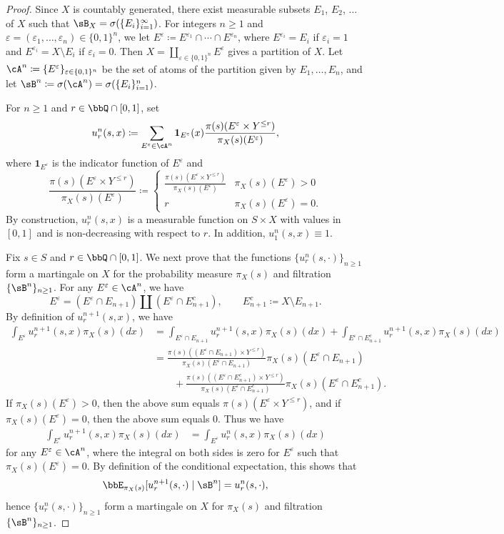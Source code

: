 \documentclass[12pt,reqno]{amsart}%
\theoremstyle{plain}
\theoremstyle{definition}
\def\ve{\varepsilon}
\def\one{\boldsymbol{1}}
\begin{document}
\begin{proof}
	Since $X$ is countably generated, there exist measurable subsets $E_1$, $E_2$, $\ldots$ of $X$
	such that $\sB_X=\sigma(\{E_i\}_{i=1}^\infty)$.  For integers $n\geq 1$ and $\ve=(\ve_1,\ldots,\ve_n)\in\{0,1\}^n$,
	we let $E^\ve\coloneqq E^{\ve_1}\cap\cdots\cap E^{\ve_n}$, where $E^{\ve_i}=E_i$ if $\ve_i=1$
	and  $E^{\ve_i}=X\setminus E_i$ if $\ve_i=0$.  Then $X=\coprod_{\ve\in\{0,1\}^n}E^\ve$ gives
	a partition of $X$.  Let $\cA^n\coloneqq\{E^\ve\}_{\ve\in\{0,1\}^n}$ be the set of atoms of the partition given by $E_1,\ldots,E_n$,
	and let $\sB^n\coloneqq\sigma(\cA^n)=\sigma(\{E_i\}_{i=1}^n)$.

	For $n\geq 1$ and $r\in\bbQ\cap[0,1]$, set
	\[
		u^n_r(s,x)\coloneqq
			\sum_{E^\ve\in\cA^n} \one_{E^\ve}(x)\frac{\pi(s)(E^\ve\times Y^{\leq r})}{\pi_X(s)(E^\ve)},
	\]
	where $\one_{E^\ve}$ is the indicator function of $E^\ve$
	and
	\begin{equation}
		\frac{\pi(s)(E^\ve\times Y^{\leq r})}{\pi_X(s)(E^\ve)}\coloneqq
		\begin{cases}
			\frac{\pi(s)(E^\ve\times Y^{\leq r})}{\pi_X(s)(E^\ve)}  &\pi_X(s)(E^\ve)>0\\
			r  &  \pi_X(s)(E^\ve)=0.
		\end{cases}
	\end{equation}
	By construction, $u^n_r(s,x)$ is a measurable function on $S\times X$ with values in $[0,1]$
	and is non-decreasing with respect to $r$.  In addition, $u^n_1(s,x)\equiv 1$.

	Fix $s\in S$ and $r\in\bbQ\cap[0,1]$.  We next prove that the functions $\{u^n_r(s,\cdot)\}_{n\geq1}$
	form a martingale on $X$ for the probability measure $\pi_X(s)$ and
	filtration $\{\sB^n\}_{n\geq 1}$.
	For any $E^\ve\in\cA^n$, we have
	\[
		E^\ve = (E^\ve \cap E_{n+1})\amalg (E^\ve \cap E^c_{n+1}),\qquad
		E^c_{n+1}\coloneqq X\setminus E_{n+1}.
	\]
	By definition of $u^{n+1}_r(s,x)$, we have
	\begin{align*}
		\int_{E^\ve} u^{n+1}_r(s,x)\pi_X(s)(dx)&=
		\int_{E^\ve\cap E_{n+1}} u^{n+1}_r(s,x)\pi_X(s)(dx)+\int_{E^\ve\cap E^c_{n+1}} u^{n+1}_r(s,x)\pi_X(s)(dx)\\
		& =\frac{\pi(s)((E^\ve\cap E_{n+1})\times Y^{\leq r})}{\pi_X(s)(E^\ve\cap E_{n+1})} \pi_X(s)(E^\ve\cap E_{n+1}) \\
		 &\qquad+\frac{\pi(s)((E^\ve\cap E^c_{n+1})\times Y^{\leq r})}{\pi_X(s)(E^\ve\cap E^c_{n+1})} \pi_X(s)(E^\ve\cap E^c_{n+1}).
	\end{align*}
	If $\pi_X(s)(E^\ve)>0$, then the above sum equals $\pi(s)(E^\ve\times Y^{\leq r})$,
	and if $\pi_X(s)(E^\ve)=0$, then the above sum equals $0$.
	Thus we have
	\begin{align*}
		\int_{E^\ve} u^{n+1}_r(s,x)\pi_X(s)(dx)&=\int_{E^\ve} u^{n}_r(s,x)\pi_X(s)(dx)
	\end{align*}
	for any $E^\ve\in\cA^n$, where the integral on both sides is zero
	for $E^\ve$ such that $\pi_X(s)(E^\ve)=0$.
	By definition of the conditional expectation, this shows that
	\[
		\bbE_{\pi_X(s)}[u^{n+1}_r(s,\cdot)\mid\sB^n]=u^n_r(s,\cdot),
	\]
	hence $\{u^n_r(s,\cdot)\}_{n\geq1}$
	form a martingale on $X$ for $\pi_X(s)$ and filtration $\{\sB^n\}_{n\geq 1}$.


\end{proof}
\end{document}
